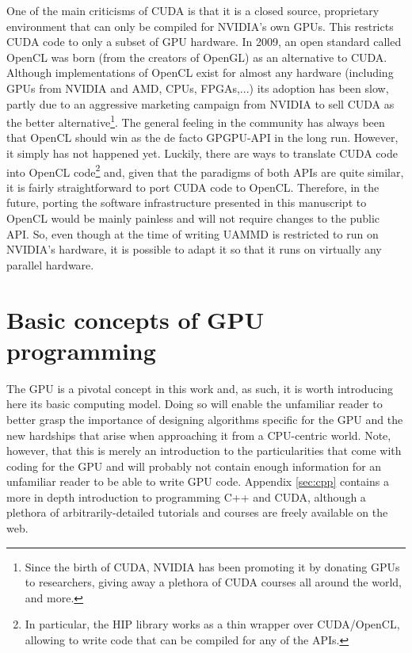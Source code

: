 \documentclass[ twoside,openright,titlepage,numbers=noenddot,%
headinclude,footinclude,cleardoublepage=empty,abstract=on,
BCOR=5mm,paper=b5,fontsize=11pt, dvipsnames
]{scrreprt}
\newcommand{\uammd}{\gls{UAMMD}\xspace}
\newcommand{\gpu}{\gls{GPU}\xspace}
\begin{document}
One of the main criticisms of CUDA is that it is a closed source, proprietary environment that can only be compiled for NVIDIA's own \glspl{GPU}. This restricts CUDA code to only a subset of \gpu hardware.
In 2009, an open standard called OpenCL\cite{Stone2010} was born (from the creators of OpenGL) as an alternative to CUDA. Although implementations of OpenCL exist for almost any hardware (including GPUs from NVIDIA and AMD, CPUs, FPGAs,...) its adoption has been slow, partly due to an aggressive marketing campaign from NVIDIA to sell CUDA as the better alternative\footnote{Since the birth of CUDA, NVIDIA has been promoting it by donating GPUs to researchers, giving away a plethora of CUDA courses all around the world, and more.}. The general feeling in the community has always been that OpenCL should win as the de facto \gls{GPGPU}-\gls{API} in the long run. However, it simply has not happened yet.
Luckily, there are ways to translate CUDA code into OpenCL code\footnote{In particular, the HIP library works as a thin wrapper over CUDA/OpenCL, allowing to write code that can be compiled for any of the \glspl{API}.} and, given that the paradigms of both \glspl{API} are quite similar, it is fairly straightforward to port CUDA code to OpenCL. Therefore, in the future, porting the software infrastructure presented in this manuscript to OpenCL would be mainly painless and will not require changes to the public \gls{API}. So, even though at the time of writing \uammd is restricted to run on NVIDIA's hardware, it is possible to adapt it so that it runs on virtually any parallel hardware.

\section{Basic concepts of GPU programming}\label{ch:gpuintroduction}
The \gpu is a pivotal concept in this work and, as such, it is worth introducing here its basic computing model. Doing so will enable the unfamiliar reader to better grasp the importance of designing algorithms specific for the \gpu and the new hardships that arise when approaching it from a CPU-centric world. Note, however, that this is merely an introduction to the particularities that come with coding for the \gpu and will probably not contain enough information for an unfamiliar reader to be able to write \gpu code. Appendix \ref{sec:cpp} contains a more in depth introduction to programming C++ and CUDA, although a plethora of arbitrarily-detailed tutorials and courses are freely available on the web.
\end{document}
